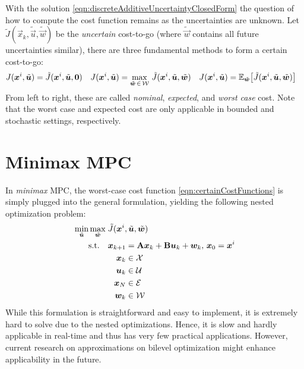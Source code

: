 	With the solution \eqref{eqn:discreteAdditiveUncertaintyClosedForm} the question of how to compute the cost function remains as the uncertainties are unknown. Let \( \tilde{J}(\vec{x}_k, \tilde{\vec{u}}, \tilde{\vec{w}}) \) be the \emph{uncertain} cost-to-go (where \( \tilde{\vec{w}} \) contains all future uncertainties similar), there are three fundamental methods to form a certain cost-to-go:
	\begin{align}
		J(\bm{x}^i, \tilde{\bm{u}}) &= \tilde{J}(\bm{x}^i, \tilde{\bm{u}}, \bm{0}) &
		J(\bm{x}^i, \tilde{\bm{u}}) &= \max_{\tilde{\bm{w}} \,\in\, \mathcal{W}}\, \tilde{J}(\bm{x}^i, \tilde{\bm{u}}, \tilde{\bm{w}}) &
		J(\bm{x}^i, \tilde{\bm{u}}) &= \mathbb{E}_{\tilde{\bm{w}}}\bigl[ \tilde{J}(\bm{x}^i, \tilde{\bm{u}}, \tilde{\bm{w}}) \bigr]
		\label{eqn:certainCostFunctions}
	\end{align}
	From left to right, these are called \emph{nominal}, \emph{expected}, and \emph{worst case} cost. Note that the worst case and expected cost are only applicable in bounded and stochastic settings, respectively.

	\section{Minimax MPC}
		In \emph{minimax} MPC, the worst-case cost function \eqref{eqn:certainCostFunctions} is simply plugged into the general formulation, yielding the following nested optimization problem:
		\begin{equation}
			\begin{aligned}
				\min_{\tilde{\bm{u}}} \max_{\tilde{\bm{w}}}\; & \tilde{J}(\bm{x}^i, \tilde{\bm{u}}, \tilde{\bm{w}}) \\
				\text{s.t.}\quad &
					\begin{aligned}[t]
						\bm{x}_{k + 1} &= \bm{\mathrm{A}} \bm{x}_k + \bm{\mathrm{B}} \bm{u}_k + \bm{w}_k,\, \bm{x}_0 = \bm{x}^i \\
						\bm{x}_k &\in \mathcal{X} \\
						\bm{u}_k &\in \mathcal{U} \\
						\bm{x}_N &\in \mathcal{E} \\
						\bm{w}_k &\in \mathcal{W}
					\end{aligned}
			\end{aligned}
		\end{equation}
		While this formulation is straightforward and easy to implement, it is extremely hard to solve due to the nested optimizations. Hence, it is slow and hardly applicable in real-time and thus has very few practical applications. However, current research on approximations on bilevel optimization might enhance applicability in the future.

